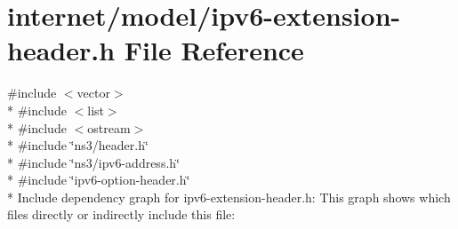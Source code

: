 \hypertarget{ipv6-extension-header_8h}{}\section{internet/model/ipv6-\/extension-\/header.h File Reference}
\label{ipv6-extension-header_8h}
{\ttfamily \#include $<$vector$>$}\\*
{\ttfamily \#include $<$list$>$}\\*
{\ttfamily \#include $<$ostream$>$}\\*
{\ttfamily \#include \char`\"{}ns3/header.\+h\char`\"{}}\\*
{\ttfamily \#include \char`\"{}ns3/ipv6-\/address.\+h\char`\"{}}\\*
{\ttfamily \#include \char`\"{}ipv6-\/option-\/header.\+h\char`\"{}}\\*
Include dependency graph for ipv6-\/extension-\/header.h\+:
This graph shows which files directly or indirectly include this file\+:
